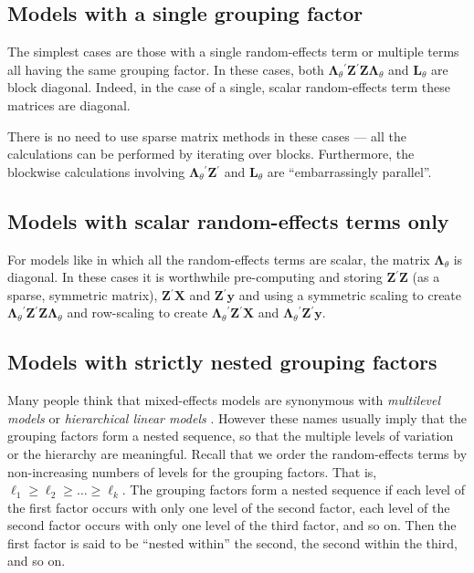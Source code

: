 \documentclass{jss}
\newcommand{\bLt}{\ensuremath{\bm\Lambda_\theta}}
\newcommand{\trans}{\ensuremath{^\prime}}
\begin{document}
\subsection{Models with a single grouping factor}
\label{sec:singlefactor}

The simplest cases are those with a single random-effects term or
multiple terms all having the same grouping factor.  In these cases,
both $\bLt\trans\bm Z\trans\bm Z\bLt$ and $\bm L_\theta$ are block
diagonal.  Indeed, in the case of a single, scalar random-effects term
these matrices are diagonal.

There is no need to use sparse matrix methods in these cases --- all
the calculations can be performed by iterating over blocks.
Furthermore, the blockwise calculations involving $\bLt\trans\bm
Z\trans$ and $\bm L_\theta$ are ``embarrassingly parallel''.

\subsection{Models with scalar random-effects terms only}
\label{sec:scalarre}

For models like  in which all the random-effects terms are
scalar, the matrix $\bLt$ is diagonal.  In these cases it is
worthwhile pre-computing and storing $\bm Z\trans\bm Z$ (as a sparse,
symmetric matrix), $\bm Z\trans\bm X$ and $\bm Z\trans\bm y$ and using
a symmetric scaling to create $\bLt\trans\bm Z\trans\bm Z\bLt$ and
row-scaling to create $\bLt\trans\bm Z\trans\bm X$ and $\bLt\trans\bm
Z\trans\bm y$.

\subsection{Models with strictly nested grouping factors}
\label{sec:nested}

Many people think that mixed-effects models are synonymous with
\emph{multilevel models} \citep{MLwiNUser:2000} or \emph{hierarchical
  linear models} \citep{Rauden:Bryk:2002}.
However these names usually imply that the grouping factors form a
nested sequence, so that the multiple levels of variation or the
hierarchy are meaningful.  Recall that we order the random-effects
terms by non-increasing numbers of levels for the grouping factors.
That is, $\ell_1\ge\ell_2\ge\dots\ge\ell_k$.  The grouping factors
form a nested sequence if each level of the first factor occurs with
only one level of the second factor, each level of the second factor
occurs with only one level of the third factor, and so on.  Then the
first factor is said to be ``nested within'' the second, the second
within the third, and so on.
\end{document}
